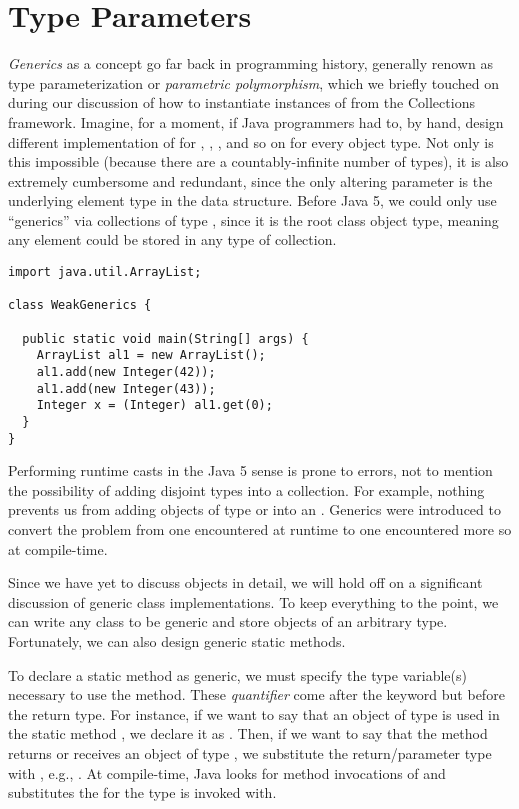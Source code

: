 \section{Type Parameters}

\emph{Generics} as a concept go far back in programming history, generally renown as type parameterization or \emph{parametric polymorphism}, which we briefly touched on during our discussion of how to instantiate instances of  from the Collections framework. 
Imagine, for a moment, if Java programmers had to, by hand, design different implementation of  for , , , and so on for every object type. 
Not only is this impossible (because there are a countably-infinite number of types), it is also extremely cumbersome and redundant, since the only altering parameter is the underlying element type in the data structure. 
Before Java 5, we could only use ``generics'' via collections of type , since it is the root class object type, meaning any element could be stored in any type of collection.

\begin{lstlisting}[language=MyJava]
import java.util.ArrayList;

class WeakGenerics {

  public static void main(String[] args) {
    ArrayList al1 = new ArrayList();
    al1.add(new Integer(42));
    al1.add(new Integer(43));
    Integer x = (Integer) al1.get(0);
  }
}
\end{lstlisting}

Performing runtime casts in the Java 5 sense is prone to errors, not to mention the possibility of adding disjoint types into a collection. 
For example, nothing prevents us from adding objects of type  or  into an . 
Generics were introduced to convert the problem from one encountered at runtime to one encountered more so at compile-time. 

Since we have yet to discuss objects in detail, we will hold off on a significant discussion of generic class implementations. 
To keep everything to the point, we can write any class to be generic and store objects of an arbitrary type. 
Fortunately, we can also design generic static methods. 

To declare a static method as generic, we must specify the type variable(s) necessary to use the method. 
These \emph{quantifier} come after the  keyword but before the return type. 
For instance, if we want to say that an object of type  is used in the static method , we declare it as . 
Then, if we want to say that the method returns or receives an object of type , we substitute the return/parameter type with , e.g., . 
At compile-time, Java looks for method invocations of  and substitutes the  for the type  is invoked with. 


